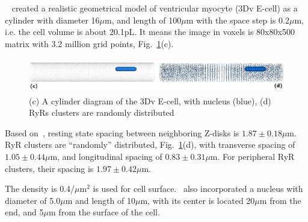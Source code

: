 ~\citep{li2007} created a realistic geometrical model of ventricular
myocyte (3Dv E-cell) as a cylinder with diameter 16$\mu$m, and length
of 100$\mu$m with the space step is 0.2$\mu$m, i.e. the cell volume is
about 20.1pL. It means the image in voxels is 80x80x500 matrix with
3.2 million grid points, Fig.~\ref{fig:Li_3Dcell}(c).

\begin{figure}[hbt]
  \centerline{\includegraphics[height=1.5cm,
    angle=0]{./images/Li_3Dcell.eps}}
  \caption{ (c) A cylinder diagram of the 3Dv E-cell, with nucleus
    (blue), (d) RyRs clusters are randomly distributed}
\label{fig:Li_3Dcell}
\end{figure}

Based on~\citep{chen-izu2006tdd}, resting state spacing between
neighboring Z-disks is $1.87\pm0.18\mu$m. RyR clusters are
``randomly'' distributed, Fig.~\ref{fig:Li_3Dcell}(d), with transverse
spacing of $1.05\pm0.44\mu$m, and longitudinal spacing of
$0.83\pm0.31\mu$m. For peripheral RyR clusters, their spacing is
$1.97\pm0.42\mu$m.

The density is 0.4/$\mu$m$^2$ is used for cell surface.~\citep{li2007}
also incorporated a nucleus with diameter of 5.0$\mu$m and length of
10$\mu$m, with its center is located 20$\mu$m from the end, and
5$\mu$m from the surface of the cell. 

